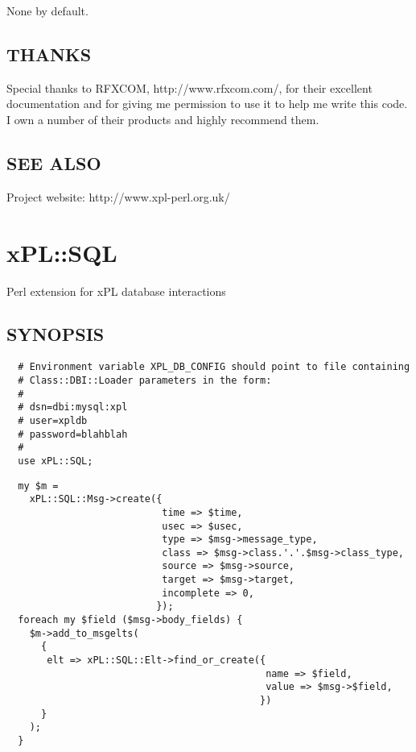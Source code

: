 \documentclass[12pt,a4paper]{article}
\begin{document}
None by default.

\subsection*{THANKS\label{xPL::RF::X10Security_THANKS}}


Special thanks to RFXCOM, \textsf{http://www.rfxcom.com/}, for their
excellent documentation and for giving me permission to use it to help
me write this code.  I own a number of their products and highly
recommend them.

\subsection*{SEE ALSO\label{xPL::RF::X10Security_SEE_ALSO}}


Project website: http://www.xpl-perl.org.uk/

\newpage
\section{xPL::SQL\label{xPL::SQL}}


Perl extension for xPL database interactions

\subsection*{SYNOPSIS\label{xPL::SQL_SYNOPSIS}}
\begin{verbatim}
  # Environment variable XPL_DB_CONFIG should point to file containing
  # Class::DBI::Loader parameters in the form:
  #
  # dsn=dbi:mysql:xpl
  # user=xpldb
  # password=blahblah
  #
  use xPL::SQL;
\end{verbatim}
\begin{verbatim}
  my $m =
    xPL::SQL::Msg->create({
                           time => $time,
                           usec => $usec,
                           type => $msg->message_type,
                           class => $msg->class.'.'.$msg->class_type,
                           source => $msg->source,
                           target => $msg->target,
                           incomplete => 0,
                          });
  foreach my $field ($msg->body_fields) {
    $m->add_to_msgelts(
      {
       elt => xPL::SQL::Elt->find_or_create({
                                             name => $field,
                                             value => $msg->$field,
                                            })
      }
    );
  }
\end{verbatim}
\end{document}
